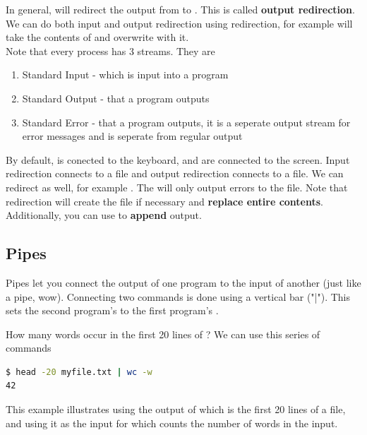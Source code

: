 \documentclass[english, 11pt]{article}
\begin{document}
In general,  will redirect the output from  to . This is called \textbf{output redirection}. We can do both input and output redirection using redirection, for example  will take the contents of  and overwrite  with it. \\
Note that every process has 3 streams. They are
\begin{enumerate}
  \item Standard Input - which is input into a program
  \item Standard Output - that a program outputs
  \item Standard Error - that a program outputs, it is a seperate output stream for error messages and is seperate from regular output
\end{enumerate}
By default,  is conected to the keyboard,  and  are connected to the screen. Input redirection connects  to a file and output redirection connects  to a file. We can redirect  as well, for example . The  will only output errors to the file. Note that redirection will create the file if necessary and \textbf{replace entire contents}. Additionally, you can use \tc{$>>$} to \textbf{append} output.

\subsection{Pipes}

  Pipes let you connect the output of one program to the input of another (just like a pipe, wow). Connecting two commands is done using a vertical bar ("|"). This sets the second program's  to the first program's .

  \begin{exmp}
    How many words occur in the first 20 lines of ?
    We can use this series of commands
    \begin{lstlisting}[language=bash,numbers=none]
$ head -20 myfile.txt | wc -w
42
    \end{lstlisting}
  \end{exmp}

  This example illustrates using the output of  which is the first 20 lines of a file, and using it as the input for  which counts the number of words in the input.
\end{document}

